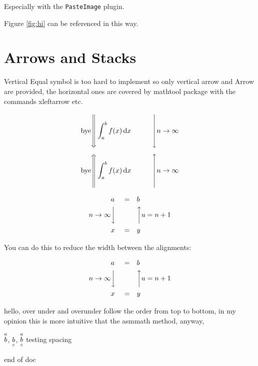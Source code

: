 \documentclass[12pt, orange, night, 0.5in]{hw}
\begin{document}
Especially with the \verb=PasteImage= plugin. 

Figure \ref{fig:hi} can be referenced in this way.

\np
\section{Arrows and Stacks}

Vertical Equal symbol is too hard to implement so only vertical arrow and Arrow are provided, the horizontal ones are covered by mathtool package with the commands xleftarrow etc.

$$\T{bye}\Dar[2]\int_a^b f(x)\D x\quad\quad\quad\dar[2]n\to\infty$$
$$\T{bye}\Uar[2]\int_a^b f(x)\D x\quad\quad\quad\uar[2]n\to\infty$$


\begin{align*}
    &a & &= & &b \\
    n\to\infty&\dar & &  & &\uar u = n + 1 \\
    &x & &= & &y
\end{align*}

You can do this to reduce the width between the alignments:

\begin{center}
    \begin{minipage}{0.5\textwidth}
        \begin{align*}
            &a & &= & &b \\
            n\to\infty&\dar & &  & &\uar u = n + 1 \\
            &x & &= & &y
        \end{align*}
    \end{minipage}
\end{center}

hello, over under and overunder follow the order from top to bottom, in my opinion this is more intuitive that the asmmath method, anyway,

$\over{a}{b}$, $\under{b}{c}$, $\overunder{a}{b}{c}$ testing spacing

end of doc
\end{document}
